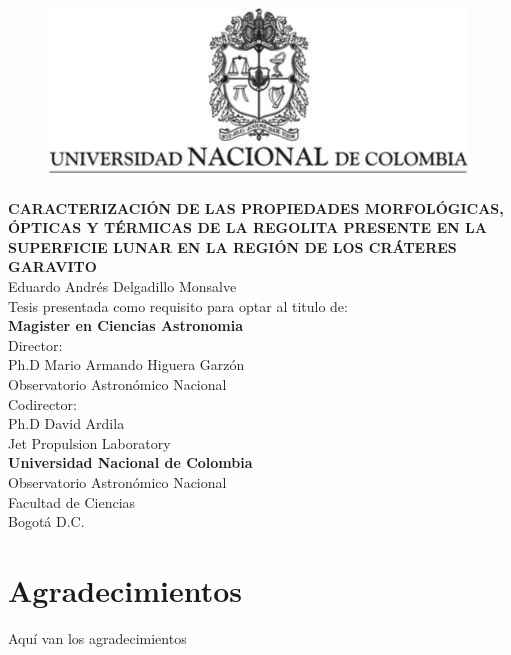 \documentclass[12pt]{article}
\begin{document}
\newpage
\begin{titlepage}
    \thispagestyle{empty}
    \begin{center}
        \begin{figure}
        \centering%
        \includegraphics{images/EscudoUN.png}
    \end{figure}
    
    \vspace{1cm}
    
        \textbf{CARACTERIZACIÓN DE LAS PROPIEDADES MORFOLÓGICAS, ÓPTICAS Y 
        TÉRMICAS DE LA REGOLITA PRESENTE EN LA SUPERFICIE LUNAR EN LA REGIÓN 
        DE LOS CRÁTERES GARAVITO}\\[1in]    
    Eduardo Andrés Delgadillo Monsalve \\  [1.5 cm]
 Tesis presentada como requisito para optar al titulo de:\\[3mm]
 \textbf {\large{Magister en Ciencias Astronomia}}\\[1cm]
 Director:\\[3mm] Ph.D Mario Armando Higuera Garzón\\[1mm] 
 Observatorio Astronómico Nacional\\[1cm]
 Codirector:\\[3mm] Ph.D David Ardila\\ Jet Propulsion Laboratory\\[1in]
 \textbf{Universidad Nacional de Colombia}\\
 Observatorio Astronómico Nacional\\
 Facultad de Ciencias\\
 Bogotá D.C.\\
 \the\year
    \end{center}
\end{titlepage}

\newpage
\thispagestyle{empty}
\null

\newpage
\thispagestyle{empty}
\section*{Agradecimientos}
Aquí van los agradecimientos
\end{document}
